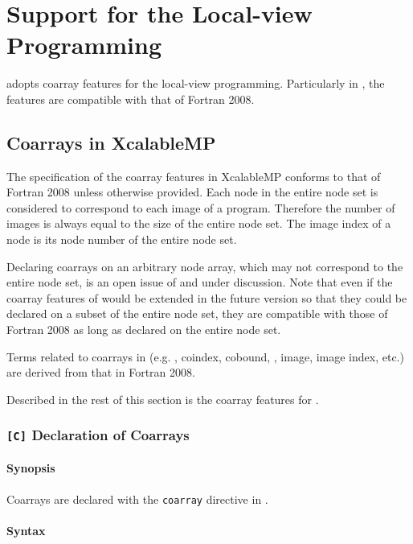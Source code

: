 \chapter{Support for the Local-view Programming}
\label{chap:Support for the Local-view Programming}

{\XMP} adopts coarray features for the local-view
programming. Particularly in {\XMPF}, the features are compatible with
that of Fortran 2008.

\section{Coarrays in XcalableMP}

The specification of the coarray features in XcalableMP conforms to that
of Fortran 2008 unless otherwise provided.
%
Each node in the entire node set is considered to correspond to each
image of a program. Therefore the number of images is always equal to
the size of the entire node set. The image index of a node is its node
number of the entire node set.

Declaring coarrays on an arbitrary node array, which may not correspond
to the entire node set, is an open issue of {\XMP} and under
discussion. Note that even if the coarray features of {\XMP} would be
extended in the future version so that they could be declared on a
subset of the entire node set, they are compatible with those of Fortran
2008 as long as declared on the entire node set.

Terms related to coarrays in {\XMP} (e.g. , coindex,
cobound, , image, image index, etc.) are derived from
that in Fortran 2008.

Described in the rest of this section is the coarray features for
{\XMPC}.

\subsection{{\tt [C]} Declaration of Coarrays}

\subsubsection*{Synopsis}

Coarrays are declared with the {\tt coarray} directive in {\XMPC}.

\subsubsection*{Syntax}

